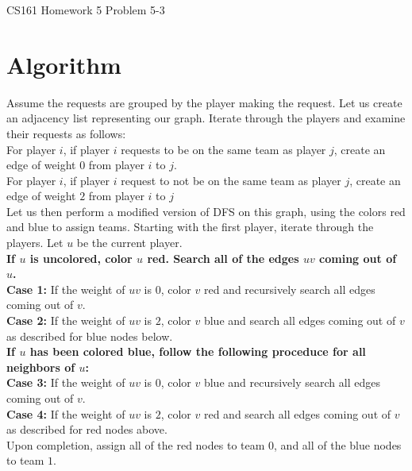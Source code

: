 \documentclass[12pt]{article}
\begin{document}
\begin{center}
{\Large CS161 Homework 5 Problem 5-3}

\end{center}

\section*{Algorithm}

Assume the requests are grouped by the player making the request. Let us create an adjacency list representing our graph. Iterate through the players and examine their requests as follows:\\ 
For player $i$, if player $i$ requests to be on the same team as player $j$, create an edge of weight $0$ from player $i$ to $j$.\\
For player $i$, if player $i$ request to not be on the same team as player $j$, create an edge of weight $2$ from player $i$ to $j$\\
Let us then perform a modified version of DFS on this graph, using the colors red and blue to assign teams. Starting with the first player, iterate through the players. Let $u$ be the current player.\\
\textbf{If $u$ is uncolored, color $u$ red. Search all of the edges $uv$ coming out of $u$.}\\
\textbf{Case 1:} If the weight of $uv$ is $0$, color $v$ red and recursively search all edges coming out of $v$.\\
\textbf{Case 2:} If the weight of $uv$ is $2$, color $v$ blue and search all edges coming out of $v$ as described for blue nodes below.\\
\textbf{If $u$ has been colored blue, follow the following proceduce for all neighbors of $u$:}\\
\textbf{Case 3:} If the weight of $uv$ is $0$, color $v$ blue and recursively search all edges coming out of $v$.\\
\textbf{Case 4:} If the weight of $uv$ is $2$, color $v$ red and search all edges coming out of $v$ as described for red nodes above.\\
Upon completion, assign all of the red nodes to team $0$, and all of the blue nodes to team $1$. 
\end{document}
